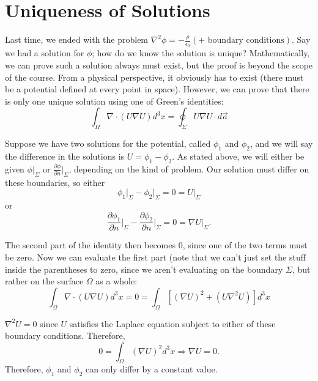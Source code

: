 \documentclass[a4paper,twoside,master.tex]{subfiles}
\begin{document}
\section{Uniqueness of Solutions}%
\label{sec:uniqueness_of_solutions}


Last time, we ended with the problem $\nabla^2\phi = -\frac{\rho}{\epsilon_0} (+\text{ boundary conditions})$. Say we had a solution for $\phi$; how do we know the solution is unique? Mathematically, we can prove such a solution always must exist, but the proof is beyond the scope of the course. From a physical perspective, it obviously has to exist (there must be a potential defined at every point in space). However, we can prove that there is only one unique solution using one of Green's identities:
\begin{equation}
    \int_\Omega\nabla\cdot(U\nabla U)d^3x = \oint_\Sigma U\nabla U\cdot d\vec{a}
\end{equation}

Suppose we have two solutions for the potential, called $\phi_1$ and $\phi_2$, and we will say the difference in the solutions is $U = \phi_1 - \phi_2$. As stated above, we will either be given $\phi\bigg|_\Sigma$ or $\frac{\partial\phi}{\partial n}\bigg|_\Sigma$, depending on the kind of problem. Our solution must differ on these boundaries, so either
\begin{equation}
    \phi_1\bigg|_\Sigma - \phi_2\bigg|_\Sigma = 0 = U\bigg|_\Sigma
\end{equation}
or
\begin{equation}
    \frac{\partial\phi_1}{\partial n}\bigg|_\Sigma - \frac{\partial\phi_2}{\partial n}\bigg|_\Sigma = 0 = \nabla U\bigg|_\Sigma.
\end{equation}

The second part of the identity then becomes $0$, since one of the two terms must be zero. Now we can evaluate the first part (note that we can't just set the stuff inside the parentheses to zero, since we aren't evaluating on the boundary $\Sigma$, but rather on the surface $\Omega$ as a whole:
\begin{equation}
    \int_\Omega \nabla\cdot(U\nabla U)d^3x = 0 = \int_\Omega [(\nabla U)^2 + (U\nabla^2 U)]d^3x
\end{equation}

$\nabla^2 U = 0$ since $U$ satisfies the Laplace equation subject to either of these boundary conditions. Therefore,
\begin{equation}
    0 = \int_\Omega (\nabla U)^2 d^3x\Rightarrow\nabla U = 0.
\end{equation}
Therefore, $\phi_1$ and $\phi_2$ can only differ by a constant value.
\end{document}
